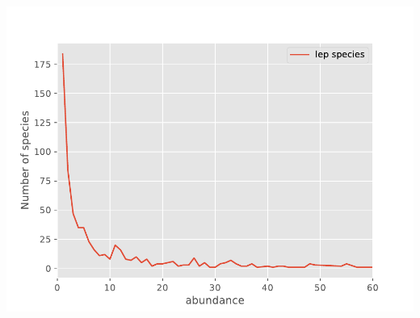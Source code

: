 \documentclass[
]{article}
\begin{document}
\begin{center}\includegraphics[width=800\linewidth,height=600\linewidth]{VPscripts/Species_vs_Abundance} \end{center}
\end{document}
